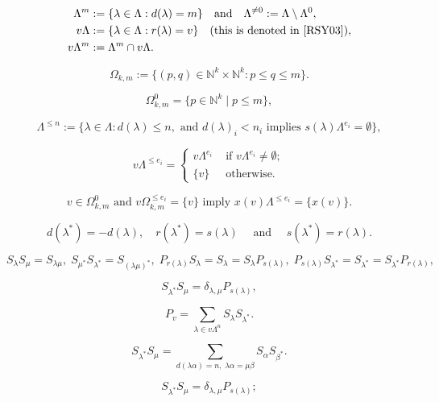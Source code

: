 \documentclass[a4paper,12pt]{article}
\begin{document}
\begin{align*}\Lambda^m &:= \{\lambda \in \Lambda : d(\lambda) = m\} \quad\text{and}\quad \Lambda^{\neq 0}:= \Lambda \setminus \Lambda^0,\\
 v \Lambda &:= \{\lambda \in \Lambda : r(\lambda) = v\} \quad\text{(this is denoted   in \cite{RSY03})},\\
v \Lambda^m &:= \Lambda^m \cap v\Lambda.
\end{align*}

\[\Omega_{k,m}:= \{(p,q) \in {\mathbb{N}}^k \times {\mathbb{N}}^k :  p \leq q \leq m \}.
 \]

\[\Omega_{k,m}^0 =\{p \in {\mathbb{N}}^k \mid p \leq m\},\]

\begin{equation*}
\Lambda^{\leq n}:=\{\lambda\in\Lambda: d(\lambda)\leq n, \text{\ and\ }d(\lambda)_i<n_i \text{\ implies\ }s(\lambda)\Lambda^{e_i}=\emptyset\},
\end{equation*}

\[
v\Lambda^{\leq e_i} = \begin{cases} v\Lambda^{e_i} & \text{ if }v\Lambda^{e_i} \neq \emptyset;\\
 \{v\} & \text{ otherwise.}\end{cases}
\]

\begin{equation}
 \label{eq:boundarypath}
v \in  \Omega_{k,m}^0 \text{ and }  v\Omega_{k,m}^{\leq e_i} = \{v\} \text{ imply }
x(v)\Lambda^{\leq e_i} = \{x(v)\}.
\end{equation}

\[
 d(\lambda^*) = -d(\lambda),\quad r(\lambda^*) = s(\lambda) \quad\text{ and }\quad s(\lambda^*)=r(\lambda).
\]

\[
S_{\lambda}S_{\mu} = S_{\lambda\mu}, \; S_{\mu^*}S_{\lambda^*} = S_{(\lambda\mu)^*}, \;
 P_{r(\lambda)}S_{\lambda} = S_{\lambda} = S_{\lambda}P_{s(\lambda)}, \;
  P_{s(\lambda)}S_{\lambda^*} = S_{\lambda^*} = S_{\lambda^*}P_{r(\lambda)},
\]

\[
S_{\lambda^*}S_{\mu} = \delta_{\lambda,\mu}P_{s(\lambda)},
\]

\[
P_v = \sum_{\lambda\in v\Lambda^n} S_{\lambda}S_{\lambda^*}.
\]

\begin{equation}\label{eq-span}
S_{\lambda^*}S_{\mu} = \sum_{d(\lambda\alpha)=n,\;\lambda\alpha = \mu\beta}S_{\alpha}S_{\beta^*}.
\end{equation}

\[S_{\lambda^{*}}S_\mu=\delta_{\lambda,\mu}P_{s(\lambda)};\]
\end{document}
